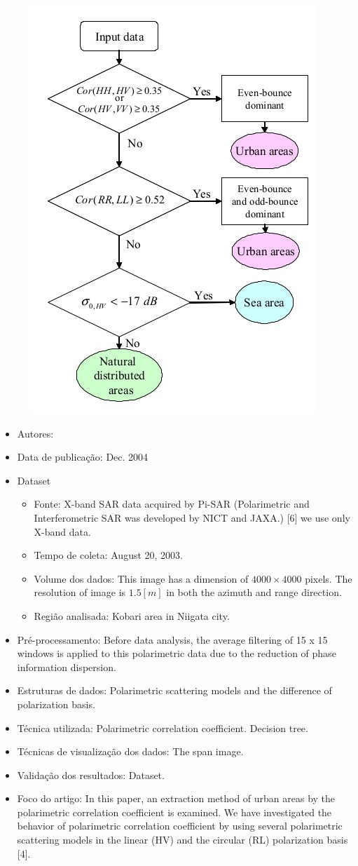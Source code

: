 \documentclass[paper=a4, fontsize=11pt]{scrartcl}
\begin{document}
\begin{figure}[hbt]
	\centering
	\includegraphics[width=0.3\linewidth]{Figures/decisiontree.jpg}
	\label{Fig:decisiontree}
\end{figure}


\begin{itemize}
    \item Autores:~\cite{moriyama2004study}
    \item Data de publicação: Dec. 2004
    \item Dataset
    \begin{itemize}
        \item Fonte: X-band SAR data acquired by Pi-SAR (Polarimetric and Interferometric SAR was developed by NICT and JAXA.) [6] we use only X-band data.
        \item Tempo de coleta: August 20, 2003.
        \item Volume dos dados: This image has a dimension of $4000 \times 4000$ pixels. The resolution of image is $1.5[m]$ in both the azimuth and range direction.
        \item Região analisada: Kobari area in Niigata city.
    \end{itemize}
    \item Pré-processamento: Before data analysis, the average filtering of 15 x 15 windows is applied to this polarimetric data due to the reduction of phase information dispersion.
    \item Estruturas de dados: Polarimetric scattering models and the difference of polarization basis.
    \item Técnica utilizada: Polarimetric correlation coefficient. Decision tree.
    \item Técnicas de visualização dos dados: The span image.
    \item Validação dos resultados: Dataset.
    \item Foco do artigo: In this paper, an extraction method of urban areas by the polarimetric correlation coefficient is examined. We have investigated the behavior of polarimetric correlation coefficient by using several polarimetric scattering models in the linear (HV) and the circular (RL) polarization basis [4].   
\end{itemize}
\end{document}
